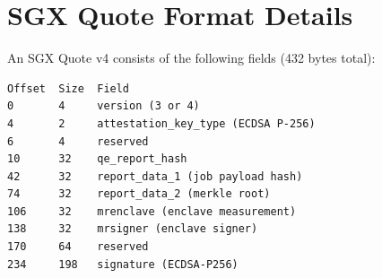 \section{SGX Quote Format Details}


An SGX Quote v4 consists of the following fields (432 bytes total):

\begin{lstlisting}
Offset  Size  Field
0       4     version (3 or 4)
4       2     attestation_key_type (ECDSA P-256)
6       4     reserved
10      32    qe_report_hash
42      32    report_data_1 (job payload hash)
74      32    report_data_2 (merkle root)
106     32    mrenclave (enclave measurement)
138     32    mrsigner (enclave signer)
170     64    reserved
234     198   signature (ECDSA-P256)
\end{lstlisting}

